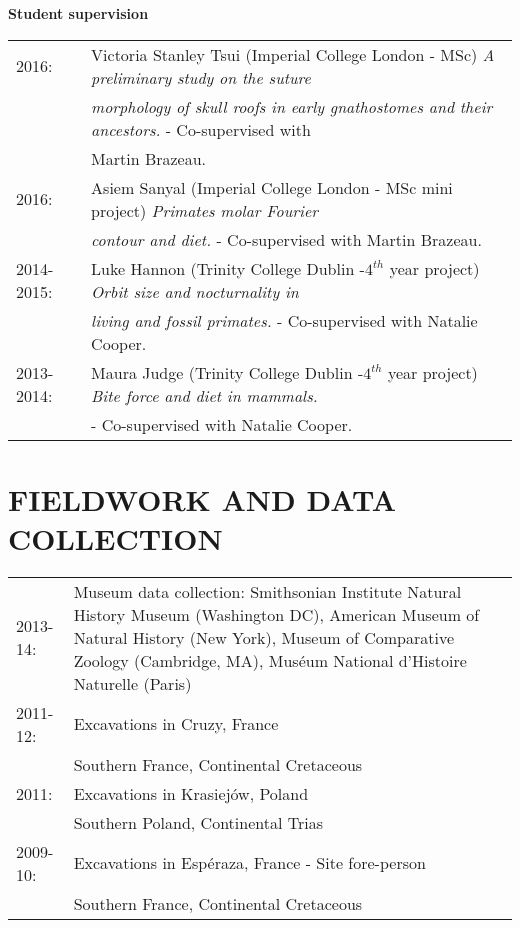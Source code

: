\documentclass[10pt,a4paper]{article}
\begin{document}
{\raggedright\textbf{Student supervision}\\[1.5ex]
\begin{tabular}{ll}
2016: & Victoria Stanley Tsui (Imperial College London - MSc) \textit{A preliminary study on the suture}\\
& \textit{morphology of skull roofs in early gnathostomes and their ancestors.} - Co-supervised with\\
& Martin Brazeau.\\
2016: & Asiem Sanyal (Imperial College London - MSc mini project) \textit{Primates molar Fourier}\\
& \textit{contour and diet.} - Co-supervised with Martin Brazeau.\\
2014-2015: & Luke Hannon (Trinity College Dublin -$4^{th}$ year project) \textit{Orbit size and nocturnality in}\\
& \textit{living and fossil primates.} - Co-supervised with Natalie Cooper.\\
2013-2014: & Maura Judge (Trinity College Dublin -$4^{th}$ year project) \textit{Bite force and diet in mammals.}\\
&  - Co-supervised with Natalie Cooper.\\
\end{tabular}
\bigskip

\section{FIELDWORK AND DATA COLLECTION}
\begin{tabular}{lp{14cm}}
2013-14: & Museum data collection: Smithsonian Institute Natural History Museum (Washington DC), American Museum of Natural History (New York), Museum of Comparative Zoology (Cambridge, MA), Mus\'{e}um National d'Histoire Naturelle (Paris) \\
2011-12: & Excavations in Cruzy, France \\
& Southern France, Continental Cretaceous\\
2011: & Excavations in Krasiej\'{o}w, Poland\\
& Southern Poland, Continental Trias\\
2009-10: & Excavations in Esp\'{e}raza, France - Site fore-person\\
& Southern France, Continental Cretaceous\\
\end{tabular}
\bigskip

}
\end{document}
